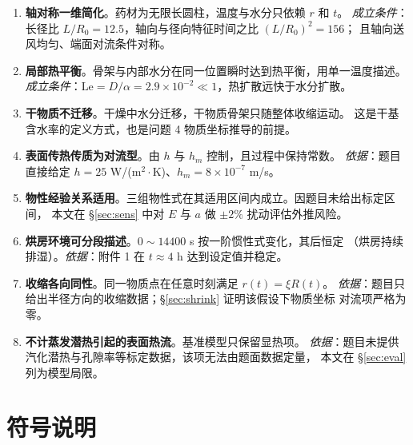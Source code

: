 \documentclass[withoutpreface,bwprint]{cumcmthesis}
\begin{document}
\begin{enumerate}[leftmargin=1.9em,itemsep=2pt]
\item \textbf{轴对称一维简化}。药材为无限长圆柱，温度与水分只依赖 $r$ 和 $t$。
\emph{成立条件}：长径比 $L/R_0=12.5$，轴向与径向特征时间之比 $(L/R_0)^2=156$；
且轴向送风均匀、端面对流条件对称。
\item \textbf{局部热平衡}。骨架与内部水分在同一位置瞬时达到热平衡，用单一温度描述。
\emph{成立条件}：$\mathrm{Le}=D/\alpha=2.9\times10^{-2}\ll1$，热扩散远快于水分扩散。
\item \textbf{干物质不迁移}。干燥中水分迁移，干物质骨架只随整体收缩运动。
这是干基含水率的定义方式，也是问题 4 物质坐标推导的前提。
\item \textbf{表面传热传质为对流型}。由 $h$ 与 $h_m$ 控制，且过程中保持常数。
\emph{依据}：题目直接给定 $h=25$ W/(m$^2\cdot$K)、$h_m=8\times10^{-7}$ m/s。
\item \textbf{物性经验关系适用}。三组物性式在其适用区间内成立。因题目未给出标定区间，
本文在 \S\ref{sec:sens} 中对 $E$ 与 $a$ 做 $\pm2\%$ 扰动评估外推风险。
\item \textbf{烘房环境可分段描述}。$0\sim14400$ s 按一阶惯性式变化，其后恒定
（烘房持续排湿）。\emph{依据}：附件 1 在 $t\approx4$ h 达到设定值并稳定。
\item \textbf{收缩各向同性}。同一物质点在任意时刻满足 $r(t)=\xi R(t)$。
\emph{依据}：题目只给出半径方向的收缩数据；\S\ref{sec:shrink} 证明该假设下物质坐标
对流项严格为零。
\item \textbf{不计蒸发潜热引起的表面热流}。基准模型只保留显热项。
\emph{依据}：题目未提供汽化潜热与孔隙率等标定数据，该项无法由题面数据定量，
本文在 \S\ref{sec:eval} 列为模型局限。
\end{enumerate}

\section{符号说明}
\end{document}
